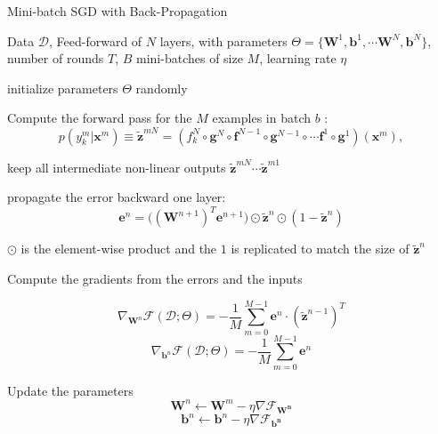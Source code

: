 \begin{algorithm}[t]
\label{algo:backprop}

   \caption{Mini-batch SGD with Back-Propagation \label{alg:maxent_gd}}

\begin{algorithmic}[1]

    Data $\mathcal{D}$, Feed-forward of $N$ layers, with parameters $\Theta=\{\mathbf{W}^1, \mathbf{b}^1, \cdots \mathbf{W}^N, \mathbf{b}^N\}$, number of rounds $T$, $B$ mini-batches of size $M$, learning rate $\eta$

   \STATE initialize parameters $\Theta$ randomly 

	\STATE Compute the forward pass for the $M$ examples in batch $b$ :
    $$p(y_k^m|\mathbf{x}^m) \equiv \tilde{\mathbf{z}}^{mN} = (f_k^N \circ \mathbf{g}^N \circ \mathbf{f}^{N-1} \circ \mathbf{g}^{N-1} \circ \cdots \mathbf{f}^1 \circ \mathbf{g}^1)(\mathbf{x}^m),$$

	\STATE keep all intermediate non-linear outputs $\tilde{\mathbf{z}}^{mN} \cdots \tilde{\mathbf{z}}^{m1}$

        \ELSE
	    \STATE propagate the error backward one layer:  
        $$\mathbf{e}^{n} = \Big((\mathbf{W}^{n+1})^T \mathbf{e}^{n+1}\Big) \odot \tilde{\mathbf{z}}^n \odot (\mathbf{\mathrm{1}}-\tilde{\mathbf{z}}^n)$$

        $\odot$ is the element-wise product and the $\mathbf{\mathrm{1}}$ is replicated to match the size of $\tilde{\mathbf{z}}^n$
        \ENDIF 

        \STATE Compute the gradients from the errors and the inputs

        $$\nabla_{\mathbf{W}^n}\mathcal{F}(\mathcal{D};\Theta)  = -\frac1M \sum_{m=0}^{M-1} \mathbf{e}^{n} \cdot \left(\tilde{\mathbf{z}}^{n-1}\right)^T$$ 
        $$\nabla_{\mathbf{b}^n}\mathcal{F}(\mathcal{D};\Theta)  = - \frac1M \sum_{m=0}^{M-1} \mathbf{e}^{n}$$  

        \STATE Update the parameters 
            $$\mathbf{W}^n \leftarrow \mathbf{W}^m - \eta \nabla\mathcal{F}_\mathbf{W^n}$$ 
            $$\mathbf{b}^n \leftarrow \mathbf{b}^n - \eta \nabla\mathcal{F}_\mathbf{b^n}$$  

	\ENDFOR

	\ENDFOR
	\ENDFOR
\end{algorithmic}
\end{algorithm}

